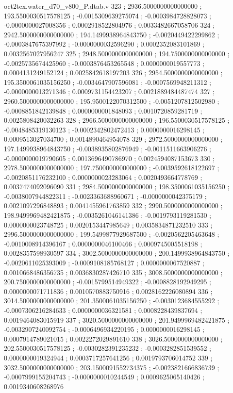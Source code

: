 \begin{filecontents}[overwrite]{oct2tex.water_d70_v800_P.dtab.v}
323 ; 2936.5000000000000000 ; 193.5500030517578125 ; -0.0015309639275074 ; -0.0003984728828073 ; -0.0000000027008356 ; 0.0002918522804976 ; 0.0033482667058706
324 ; 2942.5000000000000000 ; 194.1499938964843750 ; -0.0020449422299862 ; -0.0003847675397992 ; -0.0000000032596290 ; 0.0002352083101869 ; 0.0032567027956247
325 ; 2948.5000000000000000 ; 194.7500000000000000 ; -0.0025735674425960 ; -0.0003876453265548 ; 0.0000000019557773 ; 0.0004131249152124 ; 0.0025842618197203
326 ; 2954.5000000000000000 ; 195.3500061035156250 ; -0.0034647907596081 ; -0.0007569948211312 ; -0.0000000013271346 ; 0.0009731154423207 ; 0.0021889484487474
327 ; 2960.5000000000000000 ; 195.9500122070312500 ; -0.0051207812502980 ; -0.0008851842139848 ; 0.0000000001848093 ; 0.0010720859281719 ; 0.0025808420032263
328 ; 2966.5000000000000000 ; 196.5500030517578125 ; -0.0048485319130123 ; -0.0002342802472413 ; 0.0000000016298145 ; 0.0009513027034700 ; 0.0014890464954078
329 ; 2972.5000000000000000 ; 197.1499938964843750 ; -0.0038935802876949 ; -0.0011511663906276 ; -0.0000000019790605 ; 0.0013696490786970 ; 0.0024594087153673
330 ; 2978.5000000000000000 ; 197.7500000000000000 ; -0.0039592618122697 ; -0.0020851176232100 ; 0.0000000023283064 ; 0.0020493664778769 ; 0.0037474092096090
331 ; 2984.5000000000000000 ; 198.3500061035156250 ; -0.0038007944822311 ; -0.0023363688960671 ; -0.0000000042375179 ; 0.0021097296848893 ; 0.0041455961763859
332 ; 2990.5000000000000000 ; 198.9499969482421875 ; -0.0035261046141386 ; -0.0019793119281530 ; 0.0000000023748725 ; 0.0020153447985649 ; 0.0035834871232510
333 ; 2996.5000000000000000 ; 199.5499877929687500 ; -0.0020562205463648 ; -0.0010008914396167 ; 0.0000000046100466 ; 0.0009745005518198 ; 0.0028357598930597
334 ; 3002.5000000000000000 ; 200.1499938964843750 ; -0.0020611025393009 ; -0.0009108185768127 ; 0.0000000067520887 ; 0.0010668486356735 ; 0.0036830287426710
335 ; 3008.5000000000000000 ; 200.7500000000000000 ; -0.0015799514949322 ; -0.0008828192949295 ; 0.0000000071711836 ; 0.0010570883750916 ; 0.0028162226080894
336 ; 3014.5000000000000000 ; 201.3500061035156250 ; -0.0030123684555292 ; -0.0007306216284633 ; 0.0000000036321581 ; 0.0008228439837694 ; 0.0019464083015919
337 ; 3020.5000000000000000 ; 201.9499969482421875 ; -0.0032907240092754 ; -0.0006496934220195 ; 0.0000000016298145 ; 0.0007914789021015 ; 0.0022272029891610
338 ; 3026.5000000000000000 ; 202.5500030517578125 ; -0.0030282391235232 ; -0.0003282851539552 ; 0.0000000019324944 ; 0.0003717257641256 ; 0.0019793706014752
339 ; 3032.5000000000000000 ; 203.1500091552734375 ; -0.0023821666836739 ; -0.0007999155204743 ; -0.0000000010244549 ; 0.0009625065140426 ; 0.0019340608268976

\end{filecontents}
